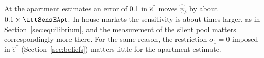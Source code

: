 At the apartment estimates an error of 0.1 in $\hat e^*$ moves $\hat\psi_\delta$ by about $0.1\times\attSensEApt$. In house markets the sensitivity is about \attSensRatio{} times larger, as in Section~\ref{sec:equilibrium}, and the measurement of the silent pool matters correspondingly more there. For the same reason, the restriction $\sigma_1=0$ imposed in $\hat e^*$ (Section~\ref{sec:beliefs}) matters little for the apartment estimate.